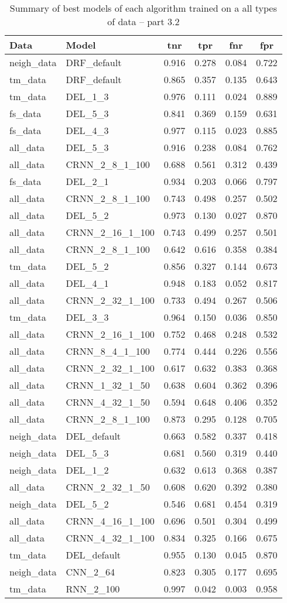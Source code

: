 \documentclass[thesis=M,english]{FITthesis}[2012/10/20]
\begin{document}
\begin{table}[H]\centering
\begin{small}
    \caption{Summary of best models of each algorithm trained on a all types of data -- part 3.2}\label{tab:all_data_summary_3_2}
    \begin{tabular}{|l|l|c|c|c|c|}\hline
Data & Model & \gls{tnr} & \gls{tpr} & \gls{fnr} & \gls{fpr} \tabularnewline \hline \hline
neigh\_data & DRF\_default & 0.916 & 0.278 & 0.084 & 0.722 \tabularnewline  \hline 
tm\_data & DRF\_default & 0.865 & 0.357 & 0.135 & 0.643 \tabularnewline  \hline 
tm\_data & DEL\_1\_3 & 0.976 & 0.111 & 0.024 & 0.889 \tabularnewline  \hline 
fs\_data & DEL\_5\_3 & 0.841 & 0.369 & 0.159 & 0.631 \tabularnewline  \hline 
fs\_data & DEL\_4\_3 & 0.977 & 0.115 & 0.023 & 0.885 \tabularnewline  \hline 
all\_data & DEL\_5\_3 & 0.916 & 0.238 & 0.084 & 0.762 \tabularnewline  \hline 
all\_data & CRNN\_2\_8\_1\_100 & 0.688 & 0.561 & 0.312 & 0.439 \tabularnewline  \hline 
fs\_data & DEL\_2\_1 & 0.934 & 0.203 & 0.066 & 0.797 \tabularnewline  \hline 
all\_data & CRNN\_2\_8\_1\_100 & 0.743 & 0.498 & 0.257 & 0.502 \tabularnewline  \hline 
all\_data & DEL\_5\_2 & 0.973 & 0.130 & 0.027 & 0.870 \tabularnewline  \hline 
all\_data & CRNN\_2\_16\_1\_100 & 0.743 & 0.499 & 0.257 & 0.501 \tabularnewline  \hline 
all\_data & CRNN\_2\_8\_1\_100 & 0.642 & 0.616 & 0.358 & 0.384 \tabularnewline  \hline 
tm\_data & DEL\_5\_2 & 0.856 & 0.327 & 0.144 & 0.673 \tabularnewline  \hline 
all\_data & DEL\_4\_1 & 0.948 & 0.183 & 0.052 & 0.817 \tabularnewline  \hline 
all\_data & CRNN\_2\_32\_1\_100 & 0.733 & 0.494 & 0.267 & 0.506 \tabularnewline  \hline 
tm\_data & DEL\_3\_3 & 0.964 & 0.150 & 0.036 & 0.850 \tabularnewline  \hline 
all\_data & CRNN\_2\_16\_1\_100 & 0.752 & 0.468 & 0.248 & 0.532 \tabularnewline  \hline 
all\_data & CRNN\_8\_4\_1\_100 & 0.774 & 0.444 & 0.226 & 0.556 \tabularnewline  \hline 
all\_data & CRNN\_2\_32\_1\_100 & 0.617 & 0.632 & 0.383 & 0.368 \tabularnewline  \hline 
all\_data & CRNN\_1\_32\_1\_50 & 0.638 & 0.604 & 0.362 & 0.396 \tabularnewline  \hline 
all\_data & CRNN\_4\_32\_1\_50 & 0.594 & 0.648 & 0.406 & 0.352 \tabularnewline  \hline 
all\_data & CRNN\_2\_8\_1\_100 & 0.873 & 0.295 & 0.128 & 0.705 \tabularnewline  \hline 
neigh\_data & DEL\_default & 0.663 & 0.582 & 0.337 & 0.418 \tabularnewline  \hline 
neigh\_data & DEL\_5\_3 & 0.681 & 0.560 & 0.319 & 0.440 \tabularnewline  \hline 
neigh\_data & DEL\_1\_2 & 0.632 & 0.613 & 0.368 & 0.387 \tabularnewline  \hline 
all\_data & CRNN\_2\_32\_1\_50 & 0.608 & 0.620 & 0.392 & 0.380 \tabularnewline  \hline 
neigh\_data & DEL\_5\_2 & 0.546 & 0.681 & 0.454 & 0.319 \tabularnewline  \hline 
all\_data & CRNN\_4\_16\_1\_100 & 0.696 & 0.501 & 0.304 & 0.499 \tabularnewline  \hline 
all\_data & CRNN\_4\_32\_1\_100 & 0.834 & 0.325 & 0.166 & 0.675 \tabularnewline  \hline 
tm\_data & DEL\_default & 0.955 & 0.130 & 0.045 & 0.870 \tabularnewline  \hline 
neigh\_data & CNN\_2\_64 & 0.823 & 0.305 & 0.177 & 0.695 \tabularnewline  \hline 
tm\_data & RNN\_2\_100 & 0.997 & 0.042 & 0.003 & 0.958 \tabularnewline  \hline 
    \end{tabular}
\end{small}
\end{table}
\end{document}
